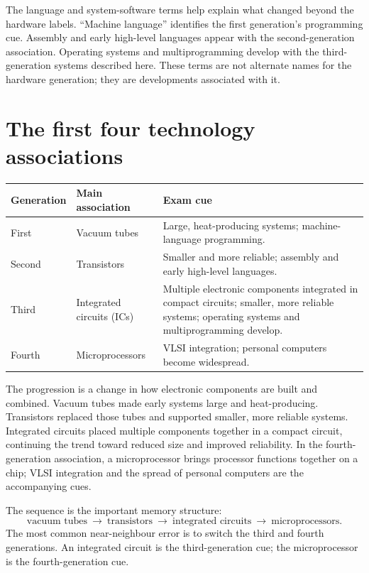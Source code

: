 \documentclass[11pt]{article}
\begin{document}
The language and system-software terms help explain what changed beyond the
hardware labels. ``Machine language'' identifies the first generation's
programming cue. Assembly and early high-level languages appear with the
second-generation association. Operating systems and multiprogramming
develop with the third-generation systems described here. These terms are
not alternate names for the hardware generation; they are developments
associated with it.

\section{The first four technology associations}
\begin{center}
\begin{tabular}{p{}p{}p{}}
\textbf{Generation} & \textbf{Main association} & \textbf{Exam cue}\\
\hline
First & Vacuum tubes & Large, heat-producing systems; machine-language programming.\\
Second & Transistors & Smaller and more reliable; assembly and early high-level languages.\\
Third & Integrated circuits (ICs) & Multiple electronic components integrated
in compact circuits; smaller, more reliable systems; operating systems and
multiprogramming develop.\\
Fourth & Microprocessors & VLSI integration; personal computers become
widespread.\\
\end{tabular}
\end{center}

The progression is a change in how electronic components are built and
combined. Vacuum tubes made early systems large and heat-producing.
Transistors replaced those tubes and supported smaller, more reliable
systems. Integrated circuits placed multiple components together in a
compact circuit, continuing the trend toward reduced size and improved
reliability. In the fourth-generation association, a microprocessor brings
processor functions together on a chip; VLSI integration and the spread of
personal computers are the accompanying cues.

The sequence is the important memory structure:
\[
\text{vacuum tubes}\ \longrightarrow\ \text{transistors}\
\longrightarrow\ \text{integrated circuits}\ \longrightarrow\
\text{microprocessors}.
\]
The most common near-neighbour error is to switch the third and fourth
generations. An integrated circuit is the third-generation cue; the
microprocessor is the fourth-generation cue.
\end{document}
